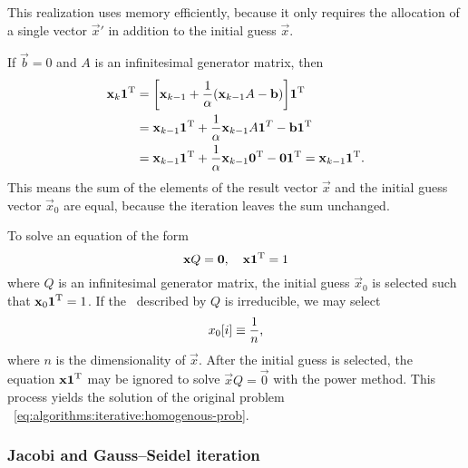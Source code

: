 This realization uses memory efficiently, because it only requires the
allocation of a single vector $\vec{x}'$ in addition to the initial
guess $\vec{x}$.

\begin{obs}
  \label{obs:algorithms:iterative:power-keepnorm}
  If $\vec{b} = 0$ and $A$ is an infinitesimal generator matrix, then
  \begin{align}
    \vec{x}_k \vec{1}^\T &= \mleft[ \vec{x}_{k - 1} + \frac{1}{\alpha}
                           \mleft( \vec{x}_{k - 1} A - \vec{b}
                           \mright) \mright] \vec{1}^\T \\
                         &= \vec{x}_{k - 1} \vec{1}^\T +
                           \frac{1}{\alpha} \vec{x}_{k - 1} A
                           \vec{1}^T - \vec{b} \vec{1}^\T \\
                         &= \vec{x}_{k - 1} \vec{1}^\T +
                           \frac{1}{\alpha} \vec{x}_{k - 1} \vec{0}^\T
                           - \vec{0} \vec{1}^\T = \vec{x}_{k - 1} \vec{1}^\T.
  \end{align}
  This means the sum of the elements of the result vector $\vec{x}$
  and the initial guess vector $\vec{x}_0$ are equal, because the
  iteration leaves the sum unchanged.
\end{obs}

To solve an equation of the form
\begin{equation}
  \label{eq:algorithms:iterative:homogenous-prob}
  \bm{\mathrm{x}} Q = \bm{\mathrm{0}},\quad \bm{\mathrm{x}} \bm{\mathrm{1}}^{\mathrm{T}} = 1
\end{equation}
where $Q$ is an infinitesimal generator matrix, the initial guess
$\vec{x}_0$ is selected such that $\bm{\mathrm{x}}_0 \bm{\mathrm{1}}^{\mathrm{T}} = 1$. If the
\CTMC\ described by $Q$ is irreducible, we may select
\begin{equation}
  \label{eq:algorithms:iterative:power-init}
  x_0[i] \equiv \frac{1}{n} \text,
\end{equation}
where $n$ is the dimensionality of $\vec{x}$. After the initial guess
is selected, the equation $\bm{\mathrm{x}} \bm{\mathrm{1}}^{\mathrm{T}}$ may be ignored to solve
$\vec{x} Q = \vec{0}$ with the power method. This process yields the
solution of the original problem%
~\eqref{eq:algorithms:iterative:homogenous-prob}.

\subsubsection{Jacobi and Gauss--Seidel iteration}
\label{ssec:algorithms:jgs}

